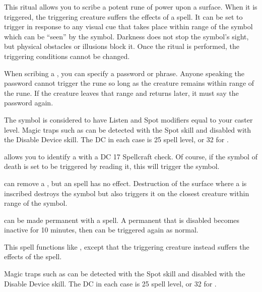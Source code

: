 \begin{spelleffect}
This ritual allows you to scribe a potent rune of power upon a surface. When it is triggered, the triggering creature suffers the effects of a  spell. It can be set to trigger in response to any visual cue that takes place within \rngclose range of the symbol which can be ``seen'' by the symbol. Darkness does not stop the symbol's sight, but physical obstacles or illusions block it. Once the ritual is performed, the triggering conditions cannot be changed.
\par When scribing a , you can specify a password or phrase. Anyone speaking the password cannot trigger the rune so long as the creature remains within \rngmed range of the rune. If the creature leaves that range and returns later, it must say the password again.
\end{spelleffect}
\begin{spellnotes}
The symbol is considered to have Listen and Spot modifiers equal to your caster level. Magic traps such as  can be detected with the Spot skill and disabled with the Disable Device skill. The DC in each case is 25 \add spell level, or 32 for .
\par {} allows you to identify a  with a DC 17 Spellcraft check. Of course, if the symbol of death is set to be triggered by reading it, this will trigger the symbol.
\par {} can remove a , but an  spell has no effect. Destruction of the surface where a  is inscribed destroys the symbol but also triggers it on the closest creature within \rngclose range of the symbol.
\par {} can be made permanent with a  spell. A permanent  that is disabled becomes inactive for 10 minutes, then can be triggered again as normal.
\end{spellnotes}

\begin{spelleffect}
This spell functions like , except that the triggering creature instead suffers the effects of the  spell.
\end{spelleffect}
\begin{spellnotes}
Magic traps such as  can be detected with the Spot skill and disabled with the Disable Device skill. The DC in each case is 25 \add spell level, or 32 for .
\end{spellnotes}

